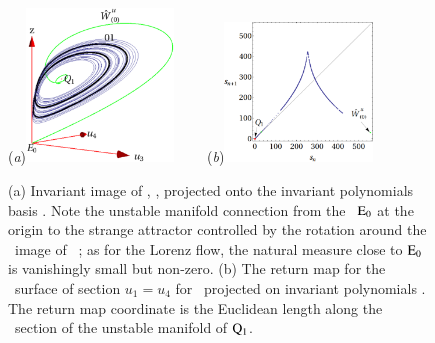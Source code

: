 \documentclass[preprint,number,sort&compress]{elsarticle}
\begin{document}
\begin{figure}[ht]
\begin{center}
(\textit{a})\includegraphics[width=0.35\textwidth,clip=true]{CLEip1}
 ~~~~(\textit{b})\includegraphics[width=0.35\textwidth,clip=true]{CLEipRM}
\end{center}
\caption{
(a) Invariant image of \cLf, , projected onto
the in\-vari\-ant polynomials basis . Note
the unstable manifold connection from the \eqv\ $\mathrm{E}_{0}$ at
the origin to the strange attractor controlled by the
rotation around the \reducedsp\ image of \reqv\ ;
as for the Lorenz flow, the natural measure close
to $\mathrm{E}_{0}$ is vanishingly small but non-zero.
(b) The return map for the \Poincare\ surface of section
$u_1=u_4$ for \cLe\ projected on in\-vari\-ant polynomials
. The return map coordinate is the
Euclidean length  along the \Poincare\
section of the unstable manifold of $\mathrm{Q}_{1}$.
    }
\label{fig:CLEip}
\end{figure}
\end{document}
